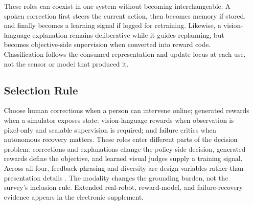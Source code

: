These roles can coexist in one system without becoming interchangeable. A spoken correction first steers the current action, then becomes memory if stored, and finally becomes a learning signal if logged for retraining. Likewise, a vision-language explanation remains deliberative while it guides replanning, but becomes objective-side supervision when converted into reward code. Classification follows the consumed representation and update locus at each use, not the sensor or model that produced it.

\subsection{Selection Rule}
\label{subsec:embodied-lessons}

Choose human corrections when a person can intervene online; generated rewards when a simulator exposes state; vision-language rewards when observation is pixel-only and scalable supervision is required; and failure critics when autonomous recovery matters. These roles enter different parts of the decision problem: corrections and explanations change the policy-side decision, generated rewards define the objective, and learned visual judges supply a training signal. Across all four, feedback phrasing and diversity are design variables rather than presentation details \citep{xi2024teaching}. The modality changes the grounding burden, not the survey's inclusion rule. Extended real-robot, reward-model, and failure-recovery evidence appears in the electronic supplement.

